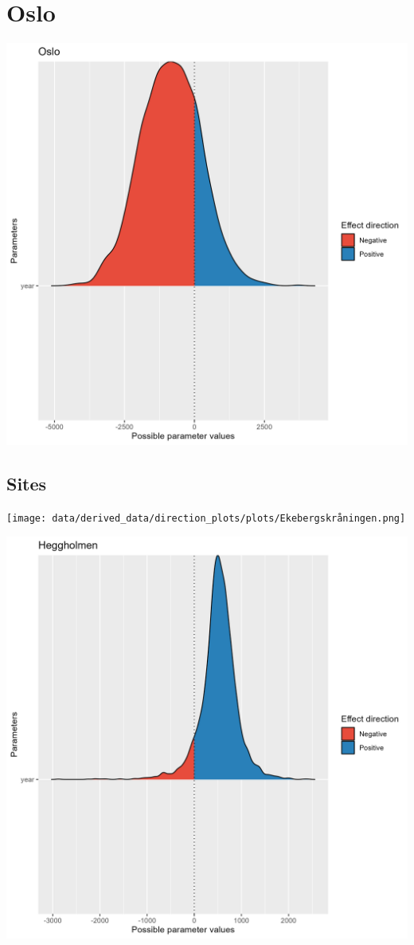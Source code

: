 \documentclass[
  letterpaper,
  DIV=11,
  numbers=noendperiod]{scrreport}
\begin{document}
\hypertarget{oslo-2}{%
\section{Oslo}\label{oslo-2}}

\includegraphics{data/derived_data/direction_plots/plots/Oslo.png}

\hypertarget{sites-1}{%
\subsection{Sites}\label{sites-1}}

\texttt{[image: data/derived\_data/direction\_plots/plots/Ekebergskråningen.png]}

\includegraphics{data/derived_data/direction_plots/plots/Heggholmen.png}
\end{document}
